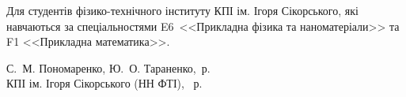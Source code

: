{\begin{alwayssingle}
		Для студентів фізико-технічного інституту КПІ ім. Ігоря Сікорського, які навчаються за спеціальностями E6~<<Прикладна фізика та наноматеріали>> та F1 <<Прикладна математика>>.

		\vfill

	\hfill
        \begin{flushright}
    	\begin{minipage}[t]{0.8\linewidth}\small
        \textcopyright{} С.~М. Пономаренко, Ю.~О. Тараненко, \the\year\,р. \\
        \textcopyright{}  КПІ ім. Ігоря Сікорського (НН ФТІ), \the\year~р.
        \end{minipage}
        \end{flushright}
		\newpage%
	\end{alwayssingle}
}

